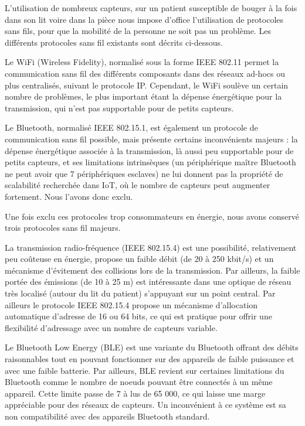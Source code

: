 \documentclass{article}
\begin{document}
L’utilisation de nombreux capteurs, sur un patient susceptible de bouger à la fois dans son lit voire dans la pièce nous impose d’office l’utilisation de protocoles sans fils, pour que la mobilité de la personne ne soit pas un problème. Les différents protocoles sans fil existants sont décrits ci-dessous.

Le WiFi (Wireless Fidelity), normalisé sous la forme IEEE 802.11 permet la communication sans fil des différents composants dans des réseaux ad-hocs ou plus centralisés, suivant le protocole IP. Cependant, le WiFi soulève un certain nombre de problèmes, le plus important étant la dépense énergétique pour la transmission, qui n’est pas supportable pour de petits capteurs.

Le Bluetooth, normalisé IEEE 802.15.1, est également un protocole de communication sans fil possible, mais présente certains inconvénients majeurs : la dépense énergétique associée à la transmission, là aussi peu supportable pour de petits capteurs, et ses limitations intrinsèques (un périphérique maître Bluetooth ne peut avoir que 7 périphériques esclaves) ne lui donnent pas la propriété de scalabilité recherchée dans IoT, où le nombre de capteurs peut augmenter fortement. Nous l’avons donc exclu.

Une fois exclu ces protocoles trop consommateurs en énergie, nous avons conservé trois protocoles sans fil majeurs.

La transmission radio-fréquence (IEEE 802.15.4) est une possibilité, relativement peu coûteuse en énergie, propose un faible débit (de 20 à 250 kbit/s) et un mécanisme d’évitement des collisions lors de la transmission. Par ailleurs, la faible portée des émissions (de 10 à 25 m) est intéressante dans une optique de réseau très localisé (autour du lit du patient) s’appuyant sur un point central. Par ailleurs le protocole IEEE 802.15.4 propose un mécanisme d’allocation automatique d’adresse de 16 ou 64 bits, ce qui est pratique pour offrir une flexibilité d’adressage avec un nombre de capteurs variable.

Le Bluetooth Low Energy (BLE) est une variante du Bluetooth offrant des débits raisonnables tout en pouvant fonctionner sur des appareils de faible puissance et avec une faible batterie. Par ailleurs, BLE revient sur certaines limitations du Bluetooth comme le nombre de noeuds pouvant être connectés à un même appareil. Cette limite passe de 7 à lus de 65 000, ce qui laisse une marge appréciable pour des réseaux de capteurs. Un inconvénient à ce système est sa non compatibilité avec des appareils Bluetooth standard.
\end{document}
